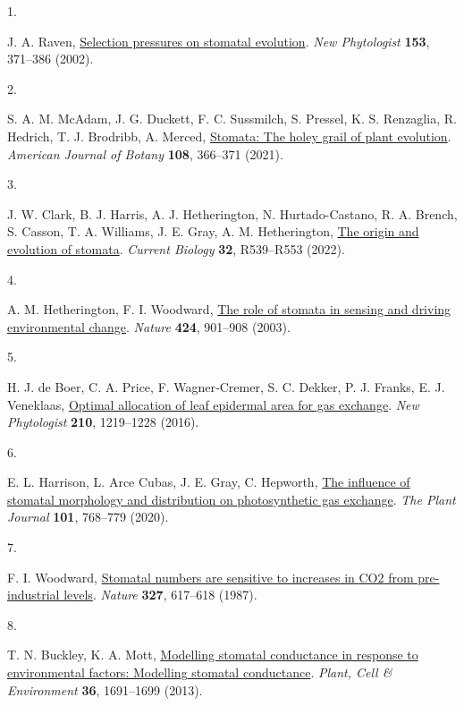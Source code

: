 \documentclass[
  letterpaper,
  DIV=11,
  numbers=noendperiod]{scrartcl}
\newlength{\cslhangindent}
\newlength{\csllabelwidth}
\newenvironment{CSLReferences}[2] %
 {\begin{list}{}{%
  \setlength{\itemindent}{0pt}
  \setlength{\leftmargin}{0pt}
  \setlength{\parsep}{0pt}
  \ifodd #1
   \setlength{\leftmargin}{\cslhangindent}
   \setlength{\itemindent}{-1\cslhangindent}
  \fi
  \setlength{\itemsep}{#2\baselineskip}}}
 {\end{list}}
\newcommand{\CSLLeftMargin}[1]{\parbox[t]{\csllabelwidth}{\strut#1\strut}}
\newcommand{\CSLRightInline}[1]{\parbox[t]{\linewidth - \csllabelwidth}{\strut#1\strut}}
\begin{document}
\label{refs}
\begin{CSLReferences}{0}{1}
\CSLLeftMargin{1. }%
\CSLRightInline{J. A. Raven,
\href{https://doi.org/10.1046/j.0028-646X.2001.00334.x}{Selection
pressures on stomatal evolution}. \emph{New Phytologist} \textbf{153},
371--386 (2002).}

\CSLLeftMargin{2. }%
\CSLRightInline{S. A. M. McAdam, J. G. Duckett, F. C. Sussmilch, S.
Pressel, K. S. Renzaglia, R. Hedrich, T. J. Brodribb, A. Merced,
\href{https://doi.org/10.1002/ajb2.1619}{Stomata: The holey grail of
plant evolution}. \emph{American Journal of Botany} \textbf{108},
366--371 (2021).}

\CSLLeftMargin{3. }%
\CSLRightInline{J. W. Clark, B. J. Harris, A. J. Hetherington, N.
Hurtado-Castano, R. A. Brench, S. Casson, T. A. Williams, J. E. Gray, A.
M. Hetherington, \href{https://doi.org/10.1016/j.cub.2022.04.040}{The
origin and evolution of stomata}. \emph{Current Biology} \textbf{32},
R539--R553 (2022).}

\CSLLeftMargin{4. }%
\CSLRightInline{A. M. Hetherington, F. I. Woodward,
\href{https://doi.org/10.1038/nature01843}{The role of stomata in
sensing and driving environmental change}. \emph{Nature} \textbf{424},
901--908 (2003).}

\CSLLeftMargin{5. }%
\CSLRightInline{H. J. de Boer, C. A. Price, F. Wagner‐Cremer, S. C.
Dekker, P. J. Franks, E. J. Veneklaas,
\href{https://doi.org/10.1111/nph.13929}{Optimal allocation of leaf
epidermal area for gas exchange}. \emph{New Phytologist} \textbf{210},
1219--1228 (2016).}

\CSLLeftMargin{6. }%
\CSLRightInline{E. L. Harrison, L. Arce Cubas, J. E. Gray, C. Hepworth,
\href{https://doi.org/10.1111/tpj.14560}{The influence of stomatal
morphology and distribution on photosynthetic gas exchange}. \emph{The
Plant Journal} \textbf{101}, 768--779 (2020).}

\CSLLeftMargin{7. }%
\CSLRightInline{F. I. Woodward,
\href{https://doi.org/10.1038/327617a0}{Stomatal numbers are sensitive
to increases in {CO2} from pre-industrial levels}. \emph{Nature}
\textbf{327}, 617--618 (1987).}

\CSLLeftMargin{8. }%
\CSLRightInline{T. N. Buckley, K. A. Mott,
\href{https://doi.org/10.1111/pce.12140}{Modelling stomatal conductance
in response to environmental factors: {Modelling} stomatal conductance}.
\emph{Plant, Cell \& Environment} \textbf{36}, 1691--1699 (2013).}


\end{CSLReferences}
\end{document}
